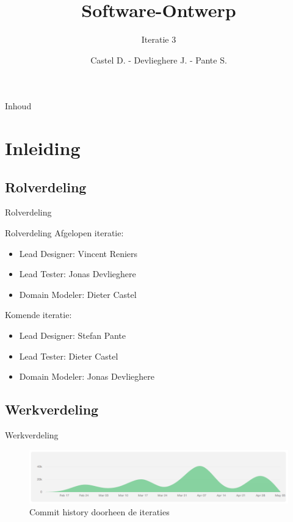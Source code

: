 \documentclass[t]{beamer}
\title{Software-Ontwerp}
\subtitle{Iteratie 3}
\author{Castel D. - Devlieghere J. - Pante S.}
\institute{KU Leuven}
\begin{document}
\frame{\titlepage} 
\begin{frame}{Inhoud}
\begin{multicols}{2}
\tableofcontents
\end{multicols}
\end{frame}



\section{Inleiding} 

\subsection{Rolverdeling}
\begin{frame}{Rolverdeling}
\begin{multicols}{2}
\tableofcontents[currentsection]
\end{multicols}
\end{frame}

\begin{frame}{Rolverdeling}
Afgelopen iteratie:
\begin{itemize}
	\item Lead Designer: Vincent Reniers
	\item Lead Tester: Jonas Devlieghere
	\item Domain Modeler: Dieter Castel
\end{itemize}
Komende iteratie:
\begin{itemize}
	\item Lead Designer: Stefan Pante
	\item Lead Tester: Dieter Castel
	\item Domain Modeler: Jonas Devlieghere
\end{itemize}
\end{frame}

\subsection{Werkverdeling}

\begin{frame}{Werkverdeling}
\begin{figure}[h!]
	\center
	\includegraphics[width= 0.9\linewidth]{img/github.png}
	\caption{Commit history doorheen de iteraties}
\end{figure}

\end{frame}
\end{document}

